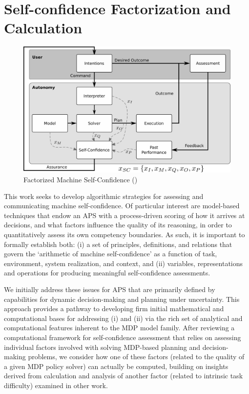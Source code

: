 \section{Self-confidence Factorization and Calculation} \label{sec:self-confidence}
    \begin{figure}[tbp]
        \centering
        \includegraphics[width=0.80\linewidth]{Figures/FaMSeC.png}
        \caption{Factorized Machine Self-Confidence (\famsec)}
        \label{fig:famsec}
        \vspace{-0.5cm}
    \end{figure}
    
    This work seeks to develop algorithmic strategies for assessing and communicating machine self-confidence. Of particular interest are model-based techniques that endow an APS with a process-driven scoring of how it arrives at decisions, and what factors influence the quality of its reasoning, in order to quantitatively assess its own competency boundaries. As such, it is important to formally establish both: (i) a set of principles, definitions, and relations that govern the `arithmetic of machine self-confidence' as a function of task, environment, system realization, and context, and (ii) variables, representations and operations for producing meaningful self-confidence assessments. 
    
    We initially address these issues for APS that are primarily defined by capabilities for dynamic decision-making and planning under uncertainty. This approach provides a pathway to developing firm initial mathematical and computational bases for addressing (i) and (ii) via the rich set of analytical and computational features inherent to the MDP model family. %
    After reviewing a computational framework for self-confidence assessment that relies on assessing individual factors involved with solving MDP-based planning and decision-making problems, we consider how one of these factors (related to the quality of a given MDP policy solver) can actually be computed, building on insights derived from calculation and analysis of another factor (related to intrinsic task difficulty) examined in other work. 
    
